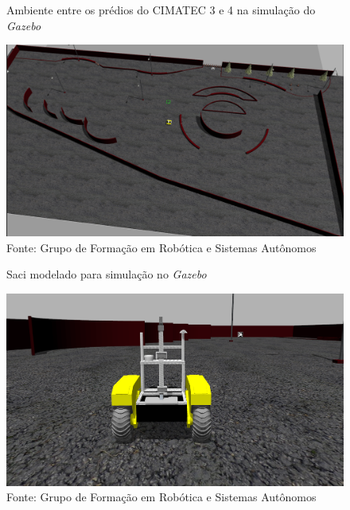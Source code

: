 \begin{figure}[H]
    \caption{Ambiente entre os prédios do CIMATEC 3 e 4 na simulação do \textit{Gazebo}}
    \centering
    \includegraphics[width= \textwidth]{Figures/ambiente_saci.png}
    \caption*{Fonte: Grupo de Formação em Robótica e Sistemas Autônomos}
    \label{fig:ambiente_saci}
\end{figure}



\begin{figure}[H]
    \caption{Saci modelado para simulação no \textit{Gazebo}}
    \centering
    \includegraphics[width= \textwidth]{Figures/warthog_simulacao.png}
    \caption*{Fonte: Grupo de Formação em Robótica e Sistemas Autônomos}
    \label{fig:warthog_simulacao}
\end{figure}



